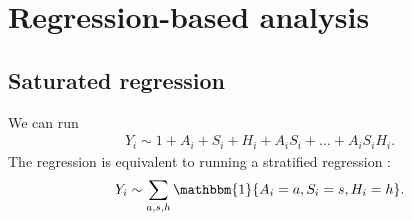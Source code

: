 \documentclass{article}
\newcommand{\tA}{\tilde{A}}
\newcommand{\tS}{\tilde{S}}
\newcommand{\tH}{\tilde{H}}
\newcommand{\indicator}{\mathbbm{1}}
\begin{document}
\section{Regression-based analysis}
\subsection{Saturated regression}
We can run 
\begin{eqnarray*}
    Y_i \sim 1 + A_i + S_i + H_i + A_iS_i + \ldots + A_i S_i H_i. 
\end{eqnarray*}
The regression is equivalent to running a stratified regression \citep{zhao2022regression}:
\begin{eqnarray*}
    Y_i \sim \sum_{a,s,h} \indicator\{A_i=a, S_i = s, H_i = h\}.
\end{eqnarray*}

\end{document}
